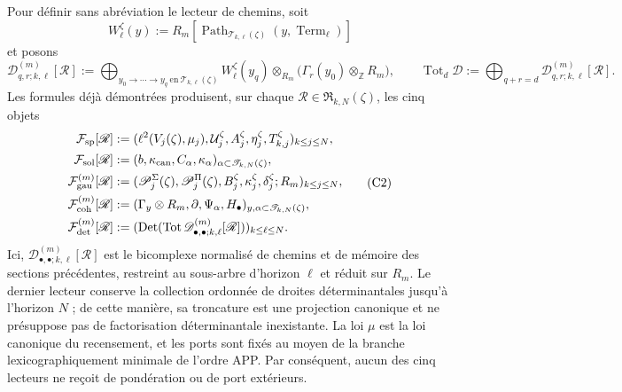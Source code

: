 Pour définir sans abréviation le lecteur de chemins, soit
\[
 W_\ell^\zeta(y):=
 R_m[\operatorname{Path}_{\mathscr T_{k,\ell}(\zeta)}
          (y,\operatorname{Term}_\ell)]
\]
et posons
\[
 \mathscr D_{q,r;k,\ell}^{(m)}[\mathscr R]
 :=\bigoplus_{y_0\to\cdots\to y_q\ \text{en}\
                  \mathscr T_{k,\ell}(\zeta)}
 W_\ell^\zeta(y_q)\otimes_{R_m}
 \bigl(\Gamma_r(y_0)\otimes_{\mathbb Z}R_m\bigr),
 \qquad
 \operatorname{Tot}_d\mathscr D
 :=\bigoplus_{q+r=d}\mathscr D_{q,r;k,\ell}^{(m)}[\mathscr R].
\]
Les formules déjà démontrées produisent, sur chaque
\(\mathscr R\in\mathfrak R_{k,N}(\zeta)\), les cinq objets
\[
\begin{aligned}
 \mathcal F_{\rm sp}[\mathscr R]
 &:=(\ell^2(V_j(\zeta),\mu_j),
       \mathcal U_j^\zeta,A_j^\zeta,\eta_j^\zeta,
       T_{k,j}^\zeta)_{k\leq j\leq N},\\
 \mathcal F_{\rm sol}[\mathscr R]
 &:=(b,\kappa_{\rm can},C_\alpha,\kappa_\alpha)
      _{\alpha\subset\mathscr T_{k,N}(\zeta)},\\
 \mathcal F_{\rm gau}^{(m)}[\mathscr R]
 &:=(\mathscr P_j^\Sigma(\zeta),\mathscr P_j^\Pi(\zeta),
       B_j^\zeta,\kappa_j^\zeta,\delta_j^\zeta;R_m)_{k\leq j\leq N},\\
 \mathcal F_{\rm coh}^{(m)}[\mathscr R]
 &:=(\Gamma_y\otimes R_m,\partial,\Psi_\alpha,H_\bullet)
      _{y,\alpha\subset\mathscr T_{k,N}(\zeta)},\\
 \mathcal F_{\rm det}^{(m)}[\mathscr R]
 &:=(\operatorname{Det}(\operatorname{Tot}
       \mathscr D_{\bullet,\bullet;k,\ell}^{(m)}[\mathscr R]))
       _{k\leq\ell\leq N}.
\end{aligned}
\tag{C2}
\label{act21:eq:cinco-lectores-comunes}
\]
Ici, \(\mathscr D_{\bullet,\bullet;k,\ell}^{(m)}[\mathscr R]\) est le
bicomplexe normalisé
de chemins et de mémoire des sections précédentes, restreint au sous-arbre
d’horizon \(\ell\) et réduit sur \(R_m\). Le dernier lecteur conserve la
collection ordonnée de droites déterminantales jusqu’à l’horizon \(N\) ; de cette
manière, sa troncature est une projection canonique et ne présuppose pas de
factorisation déterminantale inexistante. La loi \(\mu\) est la loi canonique
du recensement, et les ports sont fixés au moyen de la branche lexicographiquement minimale
de l’ordre APP. Par conséquent, aucun des cinq lecteurs ne reçoit de pondération
ou de port extérieurs.


